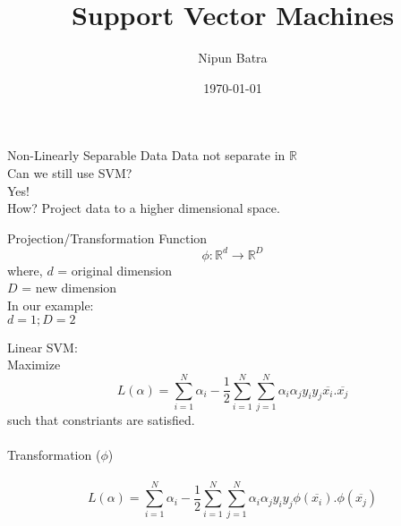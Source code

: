 \documentclass{beamer}
\title{Support Vector Machines}
\date{\today}
\author{Nipun Batra}
\institute{IIT Gandhinagar}
\begin{document}
	\maketitle
	
	\begin{frame}{Non-Linearly Separable Data}
	    Data not separate in $\mathbb{R}$ \\
	    \vspace{0.5cm}
	    Can we still use SVM? \\
	    \vspace{0.5cm}
	    Yes!\\
	    How? Project data to a higher dimensional space.
	\end{frame}
	\begin{frame}{Projection/Transformation Function}
	    \begin{equation*}
	        \phi : \mathbb{R}^{d} \rightarrow \mathbb{R}^{D}
	    \end{equation*}
	    where, $d$ = original dimension \\
	    \hspace{1cm} $D$ = new dimension \\
	    In our example:\\
	    \hspace{1cm} $d = 1; D = 2$ 
	\end{frame}
	\begin{frame}{}
	    Linear SVM:\\
	    \hspace{1cm} Maximize\\
	    \begin{equation*}
	        L(\alpha) = \sum_{i=1}^{N}\alpha_{i} - \frac{1}{2}\sum_{i=1}^{N}\sum_{j=1}^{N}\alpha_{i}\alpha_{j}y_{i}y_{j}\overline{x_{i}}.\overline{x_{j}}
	    \end{equation*}
	    \hspace{1cm} such that constriants are satisfied.\\
	   \hspace{5cm} \downarrow\\
	   \hspace{3.8cm} Transformation ($\phi$)\\
	   \hspace{5cm} \downarrow\\
	   \begin{equation*}
	       L(\alpha) = \sum_{i=1}^{N}\alpha_{i} - \frac{1}{2}\sum_{i=1}^{N}\sum_{j=1}^{N}\alpha_{i}\alpha_{j}y_{i}y_{j}\phi(\overline{x_{i}}).\phi(\overline{x_{j}})
	   \end{equation*}
	\end{frame}
\end{document}
